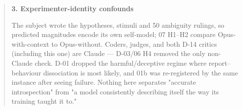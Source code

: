 \begin{quote}
\begin{itemize}
\end{itemize}
\textbf{3. Experimenter-identity confounds}

The subject wrote the hypotheses, stimuli and 50 ambiguity rulings, so predicted magnitudes encode its own self-model; 07 H1--H2 compare Opus-with-context to Opus-without. Coders, judges, and both D-14 critics (including this one) are Claude --- D-03/06 H4 removed the only non-Claude check. D-01 dropped the harmful/deceptive regime where report--behaviour dissociation is most likely, and 01b was re-registered by the same instance after seeing failure. Nothing here separates "accurate introspection" from "a model consistently describing itself the way its training taught it to."
\end{quote}
